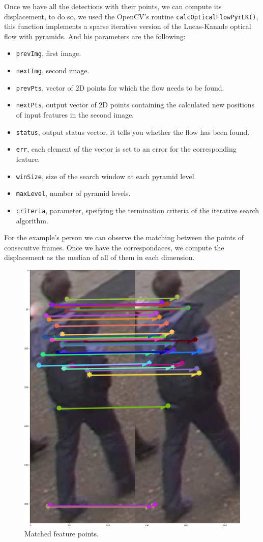 Once we have all the detections with their points, we can compute its displacement, to do so,  we used the OpenCV's routine \texttt{calcOpticalFlowPyrLK()}, this function implements a sparse iterative version of the Lucas-Kanade optical flow with pyramids. And his parameters are the following:
 
\begin{itemize}

\item \texttt{prevImg}, first image.
\item \texttt{nextImg}, second image.
\item \texttt{prevPts}, vector of 2D points for which the flow needs to be found. 
\item \texttt{nextPts}, output vector of 2D points containing the calculated new positions of input features in the second image. 
\item \texttt{status}, output status vector, it tells you whether the flow has been found.  
\item \texttt{err}, each element of the vector is set to an error for the corresponding feature.
\item \texttt{winSize}, size of the search window at each pyramid level. 
\item \texttt{maxLevel}, number of pyramid levels.  
\item \texttt{criteria}, parameter, speifying the termination criteria of the iterative search algorithm.
\end{itemize}



For the example's person we can observe the matching between the points of consecuitve frames. Once we have the correspondaces, we compute the displacement as the median of all of them in each dimension. 

\begin{figure}[hptb]
\centering         
\includegraphics[width=0.3\linewidth]{implementation/matching.png}
\caption{Matched feature points.} \label{solution4}
\end{figure}



